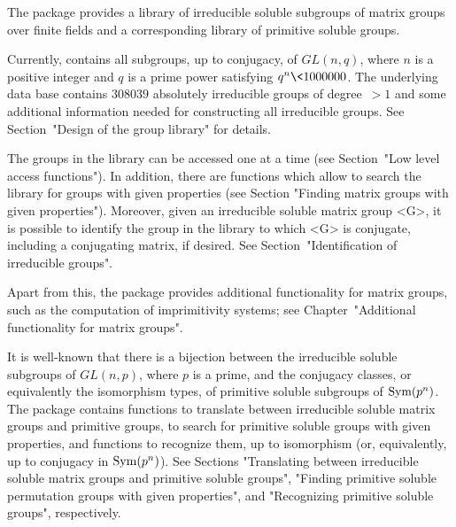 



The package {\IRREDSOL} provides a library of irreducible
soluble subgroups of matrix groups over finite fields and a corresponding library of primitive soluble groups.

Currently, {\IRREDSOL} contains all subgroups, up to conjugacy, of $GL(n, q)$, 
where $n$ is a positive integer and $q$
is a prime power satisfying  $q^n \< 1000000$. The underlying data base contains 
$308039$ absolutely irreducible groups of degree~$> 1$ and some additional information
needed for constructing all irreducible groups. See Section~"Design of the group library"
for details.

The groups in the {\IRREDSOL} 
library can be accessed one at a time (see Section~"Low
level access functions"). In addition, there are functions which allow to 
search the library for groups with given properties (see Section "Finding
matrix groups with given properties"). Moreover, given an irreducible soluble matrix group
<G>, it is possible to identify the group in the library to which <G> is conjugate,
including a conjugating matrix, if desired. See Section~"Identification of irreducible
groups".

Apart from this, the {\IRREDSOL} package provides additional functionality
for matrix groups, such as the computation of imprimitivity systems;
see Chapter~"Additional functionality for matrix groups".

It is well-known that there is a bijection between the  irreducible soluble subgroups of
$GL(n, p)$, where
$p$ is a prime, and the conjugacy classes, or equivalently the isomorphism types, of
primitive soluble subgroups of ${\rm Sym}(p^n)$. The {\IRREDSOL} package contains
functions to translate between irreducible soluble matrix groups and primitive
groups, to search for primitive soluble groups with given  properties, and functions to
recognize them, up to isomorphism (or, equivalently, up to conjugacy in ${\rm Sym}(p^n)$).  See Sections "Translating between irreducible soluble
matrix groups and primitive soluble groups", "Finding primitive soluble permutation
groups with given properties", and "Recognizing primitive soluble groups", respectively.

